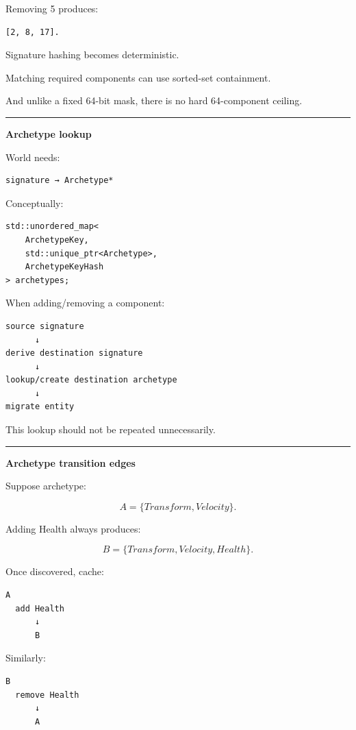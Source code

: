 Removing 5 produces:

\begin{verbatim}
[2, 8, 17].
\end{verbatim}

Signature hashing becomes deterministic.

Matching required components can use sorted-set containment.

And unlike a fixed 64-bit mask, there is no hard 64-component ceiling.

\begin{center}\rule{0.5\linewidth}{0.5pt}\end{center}

\textbf{Archetype lookup}

World needs:

\begin{verbatim}
signature → Archetype*
\end{verbatim}

Conceptually:

\begin{verbatim}
std::unordered_map<
    ArchetypeKey,
    std::unique_ptr<Archetype>,
    ArchetypeKeyHash
> archetypes;
\end{verbatim}

When adding/removing a component:

\begin{verbatim}
source signature
      ↓
derive destination signature
      ↓
lookup/create destination archetype
      ↓
migrate entity
\end{verbatim}

This lookup should not be repeated unnecessarily.

\begin{center}\rule{0.5\linewidth}{0.5pt}\end{center}

\textbf{Archetype transition edges}

Suppose archetype:

\[
A=\{Transform,Velocity\}.
\]

Adding Health always produces:

\[
B=\{Transform,Velocity,Health\}.
\]

Once discovered, cache:

\begin{verbatim}
A
  add Health
      ↓
      B
\end{verbatim}

Similarly:

\begin{verbatim}
B
  remove Health
      ↓
      A
\end{verbatim}


